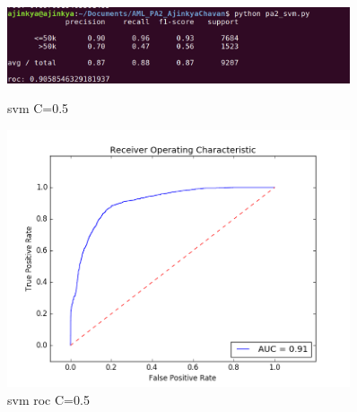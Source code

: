\documentclass{article}
\begin{document}
\begin{figure}
    \centering
    \begin{minipage}{0.45\textwidth}
        \centering
        \includegraphics[width=0.9\textwidth]{svm_05.png} %
        \caption{svm C=0.5}
    \end{minipage}\hfill
    \begin{minipage}{0.45\textwidth}
        \centering
        \includegraphics[width=0.9\textwidth]{roc_svm_05.png} %
        \caption{svm roc C=0.5}
    \end{minipage}
\end{figure}
\end{document}
